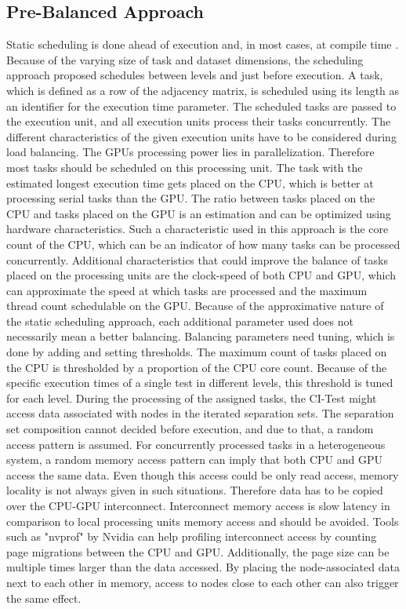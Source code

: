 \subsection{Pre-Balanced Approach}
Static scheduling is done ahead of execution and, in most cases, at compile time \cite{singhSurveyStaticScheduling2015}. Because of the varying size of task and dataset dimensions, the scheduling approach proposed schedules between levels and just before execution. A task, which is defined as a row of the adjacency matrix, is scheduled using its length as an identifier for the execution time parameter. The scheduled tasks are passed to the execution unit, and all execution units process their tasks concurrently. The different characteristics of the given execution units have to be considered during load balancing. The GPUs processing power lies in parallelization. Therefore most tasks should be scheduled on this processing unit. The task with the estimated longest execution time gets placed on the CPU, which is better at processing serial tasks than the GPU. The ratio between tasks placed on the CPU and tasks placed on the GPU is an estimation and can be optimized using hardware characteristics. Such a characteristic used in this approach is the core count of the CPU, which can be an indicator of how many tasks can be processed concurrently. Additional characteristics that could improve the balance of tasks placed on the processing units are the clock-speed of both CPU and GPU, which can approximate the speed at which tasks are processed and the maximum thread count schedulable on the GPU. Because of the approximative nature of the static scheduling approach, each additional parameter used does not necessarily mean a better balancing. Balancing parameters need tuning, which is done by adding and setting thresholds.
The maximum count of tasks placed on the CPU is thresholded by a proportion of the CPU core count. Because of the specific execution times of a single test in different levels, this threshold is tuned for each level.
During the processing of the assigned tasks, the CI-Test might access data associated with nodes in the iterated separation sets. The separation set composition cannot decided before execution, and due to that, a random access pattern is assumed. For concurrently processed tasks in a  heterogeneous system, a random memory access pattern can imply that both CPU and GPU access the same data. Even though this access could be only read access, memory locality is not always given in such situations. Therefore data has to be copied over the CPU-GPU interconnect. Interconnect memory access is slow latency in comparison to local processing units memory access and should be avoided. Tools such as "nvprof" by Nvidia can help profiling interconnect access by counting page migrations between the CPU and GPU. Additionally, the page size can be multiple times larger than the data accessed. By placing the node-associated data next to each other in memory, access to nodes close to each other can also trigger the same effect.

